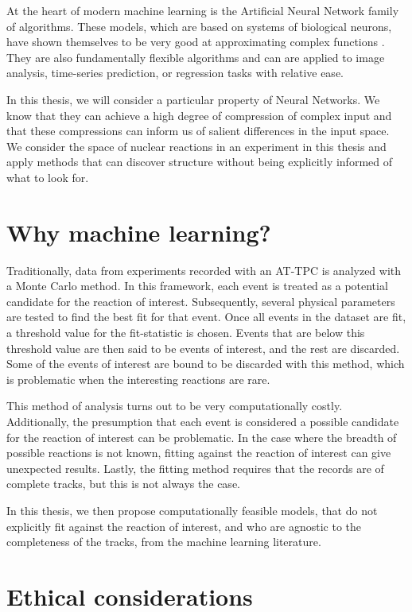 At the heart of modern machine learning is the Artificial Neural Network family of algorithms. These models, which are based on systems of biological neurons, have shown themselves to be very good at approximating complex functions \cite{Lin2017}. They are also fundamentally flexible algorithms and can are applied to image analysis, time-series prediction, or regression tasks with relative ease.

In this thesis, we will consider a particular property of Neural Networks. We know that they can achieve a high degree of compression of complex input and that these compressions can inform us of salient differences in the input space. We consider the space of nuclear reactions in an experiment in this thesis and apply methods that can discover structure without being explicitly informed of what to look for.

\section{Why machine learning?}

Traditionally, data from experiments recorded with an AT-TPC is analyzed with a Monte Carlo method. In this framework, each event is treated as a potential candidate for the reaction of interest. Subsequently, several physical parameters are tested to find the best fit for that event. Once all events in the dataset are fit, a threshold value for the fit-statistic is chosen. Events that are below this threshold value are then said to be events of interest, and the rest are discarded. Some of the events of interest are bound to be discarded with this method, which is problematic when the interesting reactions are rare. 

This method of analysis turns out to be very computationally costly. Additionally, the presumption that each event is considered a possible candidate for the reaction of interest can be problematic. In the case where the breadth of possible reactions is not known, fitting against the reaction of interest can give unexpected results. Lastly, the fitting method requires that the records are of complete tracks, but this is not always the case.

In this thesis, we then propose computationally feasible models, that do not explicitly fit against the reaction of interest, and who are agnostic to the completeness of the tracks, from the machine learning literature.

\section{Ethical considerations}

